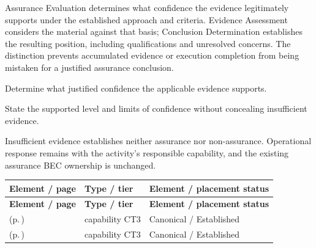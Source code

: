 Assurance Evaluation determines what confidence the evidence legitimately supports under the established approach and criteria. Evidence Assessment considers the material against that basis; Conclusion Determination establishes the resulting position, including qualifications and unresolved concerns. The distinction prevents accumulated evidence or execution completion from being mistaken for a justified assurance conclusion.



Determine what justified confidence the applicable evidence supports.



State the supported level and limits of confidence without concealing insufficient evidence.



Insufficient evidence establishes neither assurance nor non-assurance. Operational response remains with the activity's responsible capability, and the existing assurance BEC ownership is unchanged.


\begingroup\small\setlength{\TableWidth}{\dimexpr\linewidth-6\tabcolsep-4\arrayrulewidth\relax}
\begin{longtable}{|>{\raggedright\arraybackslash}p{0.52\TableWidth}|>{\raggedright\arraybackslash}p{0.2\TableWidth}|>{\raggedright\arraybackslash}p{0.28\TableWidth}|}
\hline\rowcolor{TableHead}\textbf{Element / page} & \textbf{Type / tier} & \textbf{Element / placement status}\\\hline\endfirsthead
\hline\rowcolor{TableHead}\textbf{Element / page} & \textbf{Type / tier} & \textbf{Element / placement status}\\\hline\endhead
\hline\endfoot
\nameref{cap:bc-assurance-evidence-assessment} (p.\,\pageref{cap:bc-assurance-evidence-assessment}) & capability CT3 & Canonical / Established\\\hline
\nameref{cap:bc-assurance-conclusion-determination} (p.\,\pageref{cap:bc-assurance-conclusion-determination}) & capability CT3 & Canonical / Established\\\hline
\end{longtable}\endgroup

